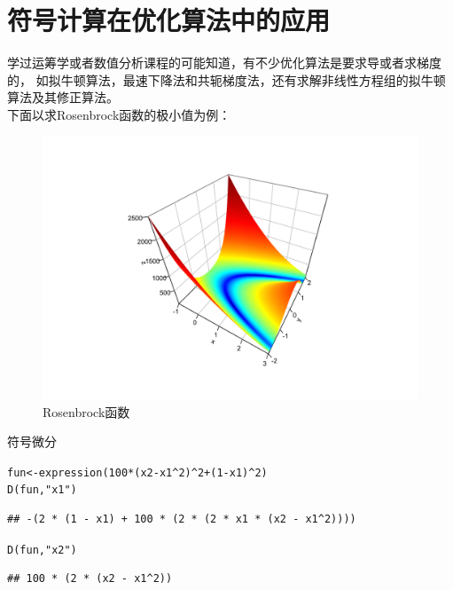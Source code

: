 \documentclass[a4paper]{ctexart}\usepackage[]{graphicx}\usepackage[]{color}
\makeatletter
\newcommand{\hlnum}[1]{\textcolor[rgb]{0.502,0.086,1}{#1}}%
\newcommand{\hlstr}[1]{\textcolor[rgb]{1,0.4,0.2}{#1}}%
\newcommand{\hlopt}[1]{\textcolor[rgb]{0.251,0.251,0.251}{#1}}%
\newcommand{\hlstd}[1]{\textcolor[rgb]{0.251,0.251,0.251}{#1}}%
\newcommand{\hlkwb}[1]{\textcolor[rgb]{0,0.439,0.902}{#1}}%
\newcommand{\hlkwd}[1]{\textcolor[rgb]{0.69,0.188,0.941}{#1}}%
\newenvironment{kframe}{%
 \def\at@end@of@kframe{}%
 \ifinner\ifhmode%
  \def\at@end@of@kframe{\end{minipage}}%
  \begin{minipage}{\columnwidth}%
 \fi\fi%
 \def\FrameCommand##1{\hskip\@totalleftmargin \hskip-\fboxsep
 \colorbox{shadecolor}{##1}\hskip-\fboxsep
     \hskip-\linewidth \hskip-\@totalleftmargin \hskip\columnwidth}%
 \MakeFramed {\advance\hsize-\width
   \@totalleftmargin\z@ \linewidth\hsize
   \@setminipage}}%
 {\par\unskip\endMakeFramed%
 \at@end@of@kframe}
\newenvironment{knitrout}{}{} %
\makeatother
\begin{document}
\section{符号计算在优化算法中的应用}

学过运筹学或者数值分析课程的可能知道，有不少优化算法是要求导或者求梯度的，
如拟牛顿算法，最速下降法和共轭梯度法，还有求解非线性方程组的拟牛顿算法及其修正算法。\\
下面以求Rosenbrock函数的极小值为例：\\
\begin{figure}[htb]
  \centering
    \includegraphics[width=.5\textwidth,height=.5\textwidth]{figure/Rosenbrock.pdf}
  \caption{Rosenbrock函数}
\end{figure}

符号微分

\begin{knitrout}
\color{fgcolor}\begin{kframe}
\begin{alltt}
\hlstd{fun}\hlkwb{<-}\hlkwd{expression}\hlstd{(}\hlnum{100}\hlopt{*}\hlstd{(x2}\hlopt{-}\hlstd{x1}\hlopt{^}\hlnum{2}\hlstd{)}\hlopt{^}\hlnum{2}\hlopt{+}\hlstd{(}\hlnum{1}\hlopt{-}\hlstd{x1)}\hlopt{^}\hlnum{2}\hlstd{)}
\hlkwd{D}\hlstd{(fun,}\hlstr{"x1"}\hlstd{)}
\end{alltt}
\begin{verbatim}
## -(2 * (1 - x1) + 100 * (2 * (2 * x1 * (x2 - x1^2))))
\end{verbatim}
\begin{alltt}
\hlkwd{D}\hlstd{(fun,}\hlstr{"x2"}\hlstd{)}
\end{alltt}
\begin{verbatim}
## 100 * (2 * (x2 - x1^2))
\end{verbatim}
\end{kframe}
\end{knitrout}
\end{document}

